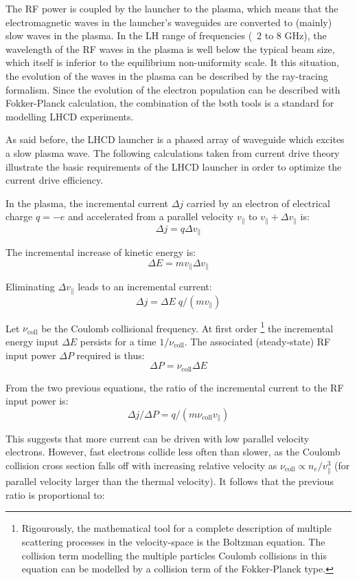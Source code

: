 The RF power is coupled by the launcher to the plasma, which means that the electromagnetic waves in the launcher’s waveguides are converted to (mainly) slow waves in the plasma. In the LH range of frequencies (~2 to 8 GHz), the wavelength of the RF waves in the plasma is well below the typical beam size, which itself is inferior to the equilibrium non-uniformity scale. It this situation, the evolution of the waves in the plasma can be described by the ray-tracing formalism. Since the evolution of the electron population can be described with Fokker-Planck calculation, the combination of the both tools is a standard for modelling LHCD experiments.

As said before, the LHCD launcher is a phased array of waveguide which excites a slow plasma wave. The following calculations taken from current drive theory illustrate the basic requirements of the LHCD launcher in order to optimize the current drive efficiency. 

In the plasma, the incremental current $\Delta j$ carried by an electron of electrical charge $q=-e$ and accelerated from a parallel velocity $v_\parallel$ to $v_\parallel + \Delta v_\parallel$ is:
$$\Delta j = q \Delta v_{\parallel}$$

The incremental increase of kinetic energy is:
$$\Delta E = m v_{\parallel} \Delta v_{\parallel}$$

Eliminating $\Delta v_{\parallel}$ leads to an incremental current: 
$$\Delta j = \Delta E \; q/(m v_{\parallel})$$ 

Let $\nu_\mathrm{coll}$ be the Coulomb collisional frequency. At first order \footnote{Rigourously, the mathematical tool for a complete description of multiple scattering processes in the velocity-space is the Boltzman equation. The collision term modelling the multiple particles Coulomb collisions in this equation can be modelled by a collision term of the Fokker-Planck type.} the incremental energy input $\Delta E$ persists for a time $1/\nu_\mathrm{coll}$. The associated (steady-state) RF input power $\Delta P$ required is thus: 
$$\Delta P = \nu_\mathrm{coll} \Delta E$$ 

From the two previous equations, the ratio of the incremental current to the RF input power is:
$$\Delta j/ \Delta P = q / (m \nu_\mathrm{coll} v_{\parallel})$$

This suggests that more current can be driven with low parallel velocity electrons. However, fast electrons collide less often than slower, as the Coulomb collision cross section falls off with increasing relative velocity as $\nu_\mathrm{coll} \propto n_e/v_{\parallel}^3$ (for parallel velocity larger than the thermal velocity). It follows that the previous ratio is proportional to: 

